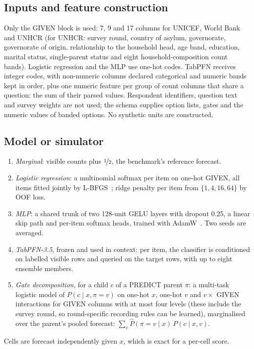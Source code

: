 \documentclass{article}
\begin{document}
\subsection{Inputs and feature construction}
Only the GIVEN block is used: 7, 9 and 17 columns for UNICEF, World Bank and UNHCR
(for UNHCR: survey round, country of asylum, governorate, governorate of origin, relationship to
the household head, age band, education, marital status, single-parent status and eight
household-composition count bands). Logistic regression and the MLP use one-hot codes. TabPFN
receives integer codes, with non-numeric columns declared categorical and numeric bands kept in
order, plus one numeric feature per group of count columns that share a question: the sum of
their parsed values. Respondent identifiers, question text and survey weights are not used; the
schema supplies option lists, gates and the numeric values of banded options. No
synthetic units are constructed.

\subsection{Model or simulator}
\label{sec:model}
\begin{enumerate}[leftmargin=*,itemsep=1pt,topsep=2pt,label=(\roman*)]
  \item \emph{Marginal}: visible counts plus $\nicefrac12$, the benchmark's reference forecast.
  \item \emph{Logistic regression}: a multinomial softmax per item on one-hot GIVEN, all items
        fitted jointly by L-BFGS~\citep{liu1989limited}; ridge penalty per item from
        $\{1,4,16,64\}$ by OOF loss.
  \item \emph{MLP}: a shared trunk of two 128-unit GELU layers with dropout 0.25, a linear skip
        path and per-item softmax heads, trained with AdamW~\citep{loshchilov2019decoupled}. Two
        seeds are averaged.
  \item \emph{TabPFN-3.5}, frozen and used in context: per item, the classifier is conditioned
        on labelled visible rows and queried on the target rows, with up to eight ensemble
        members.
  \item \emph{Gate decomposition}, for a child $c$ of a PREDICT parent $\pi$: a multi-task
        logistic model of $P(c \mid x, \pi{=}v)$ on one-hot $x$, one-hot $v$ and $v \times$
        GIVEN interactions for GIVEN columns with at most four levels (these include the survey
        round, so round-specific recording rules can be learned), marginalised over the parent's
        pooled forecast: $\sum_v \hat P(\pi{=}v \mid x)\,P(c \mid x, v)$.
\end{enumerate}
Cells are forecast independently given $x$, which is exact for a per-cell score.
\end{document}
